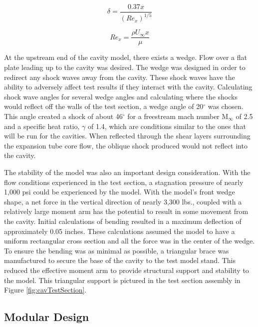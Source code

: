 \begin{equation}
\delta = \frac{0.37x}{(Re_x)^{1/5}}
\label{eq:BL}
\end{equation}

\begin{equation}
Re_x = \frac{\rho U_\infty x}{\mu}
\label{eq:Re}
\end{equation}

At the upstream end of the cavity model, there exists a wedge. Flow over a flat plate leading up to the cavity was desired. The wedge was designed in order to redirect any shock waves away from the cavity. These shock waves have the ability to adversely affect test results if they interact with the cavity. Calculating shock wave angles for several wedge angles and calculating where the shocks would reflect off the walls of the test section, a wedge angle of 20$^\circ$ was chosen. This angle created a shock of about 46$^\circ$ for a freestream mach number M$_\infty$ of 2.5 and a specific heat ratio, $\gamma$ of 1.4, which are conditions similar to the ones that will be run for the cavities. When reflected through the shear layers surrounding the expansion tube core flow, the oblique shock produced would not reflect into the cavity.

The stability of the model was also an important design consideration. With the flow conditions experienced in the test section, a stagnation pressure of nearly 1,000 psi could be experienced by the model. With the model's front wedge shape, a net force in the vertical direction of nearly 3,300 lbs., coupled with a relatively large moment arm has the potential to result in some movement from the cavity. Initial calculations of bending resulted in a maximum deflection of approximately 0.05 inches. These calculations assumed the model to have a uniform rectangular cross section and all the force was in the center of the wedge. To ensure the bending was as minimal as possible, a triangular brace was manufactured to secure the base of the cavity to the test model stand. This reduced the effective moment arm to provide structural support and stability to the model. This triangular support is pictured in the test section assembly in Figure \ref{fig:cavTestSection}.


\subsection{Modular Design}

